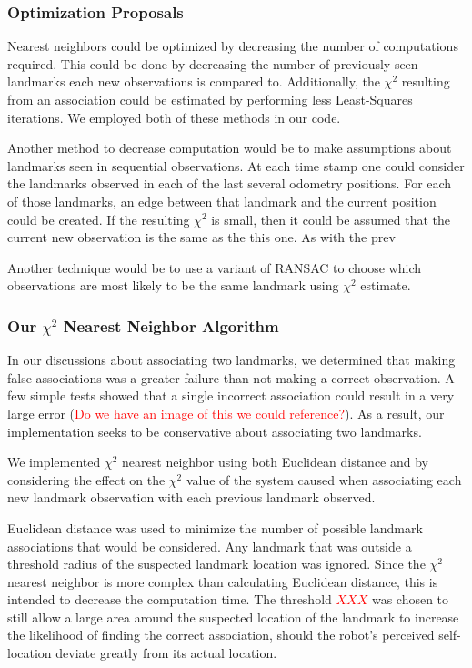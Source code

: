 \documentclass[12pt]{article}
\begin{document}
\subsubsection*{Optimization Proposals}
Nearest neighbors could be optimized by decreasing the number of computations required.  This could be done by decreasing the number of previously seen landmarks each new observations is compared to.  Additionally, the $\chi^2$ resulting from an association could be estimated by performing less Least-Squares iterations. We employed both of these methods in our code.

Another method to decrease computation would be to make assumptions about landmarks seen in sequential observations.  At each time stamp one could consider the landmarks observed in each of the last several odometry positions.  For each of those landmarks, an edge between that landmark and the current position could be created.  If the resulting $\chi^2$ is small, then it could be assumed that the current new observation is the same as the this one.  As with the prev

Another technique would be to use a variant of RANSAC to choose which observations are most likely to be the same landmark using $\chi^2$ estimate.

\subsubsection*{Our $\chi^2$ Nearest Neighbor Algorithm}
In our discussions about associating two landmarks, we determined that making false associations was a greater failure than not making a correct observation.  A few simple tests showed that a single incorrect association could result in a very large error (\textcolor{red}{Do we have an image of this we could reference?}).  As a result, our implementation seeks to be conservative about associating two landmarks.

We implemented $\chi^2$ nearest neighbor using both Euclidean distance and by considering the effect on the $\chi^2$ value of the system caused when associating each new landmark observation with each previous landmark observed.

Euclidean distance was used to minimize the number of possible landmark associations that would be considered.  Any landmark that was outside a threshold radius of the suspected landmark location was ignored.  Since the $\chi^2$ nearest neighbor is more complex than calculating Euclidean distance, this is intended to decrease the computation time.  The threshold \textcolor{red}{$XXX$} was chosen to still allow a large area around the suspected location of the landmark to increase the likelihood of finding the correct association, should the robot's perceived self-location deviate greatly from its actual location.
\end{document}
